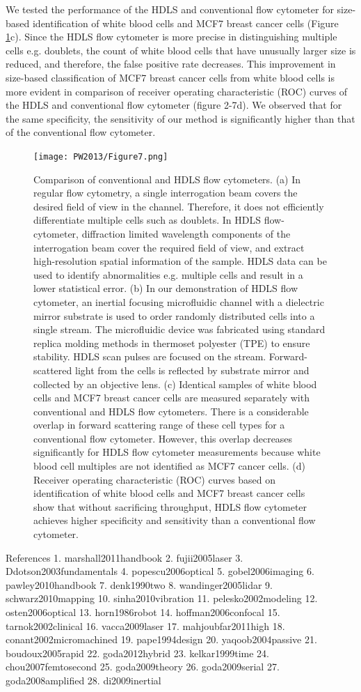 We tested the performance of the HDLS and conventional flow cytometer for size-based identification of white blood cells and MCF7 breast cancer cells (Figure \ref{fig:PW2013_Figure7}c). Since the HDLS flow cytometer is more precise in distinguishing multiple cells e.g. doublets, the count of white blood cells that have unusually larger size is reduced, and therefore, the false positive rate decreases. This improvement in size-based classification of MCF7 breast cancer cells from white blood cells is more evident in comparison of receiver operating characteristic (ROC) curves of the HDLS and conventional flow cytometer (figure 2-7d). We observed that for the same specificity, the sensitivity of our method is significantly higher than that of the conventional flow cytometer. 
 
\begin{figure}[htb!]
\centering
\texttt{[image: PW2013/Figure7.png]}
\caption{Comparison of conventional and HDLS flow cytometers. (a) In regular flow cytometry, a single interrogation beam covers the desired field of view in the channel. Therefore, it does not efficiently differentiate multiple cells such as doublets. In HDLS flow-cytometer, diffraction limited wavelength components of the interrogation beam cover the required field of view, and extract high-resolution spatial information of the sample. HDLS data can be used to identify abnormalities e.g. multiple cells and result in a lower statistical error. (b) In our demonstration of HDLS flow cytometer, an inertial focusing microfluidic channel with a dielectric mirror substrate is used to order randomly distributed cells into a single stream. The microfluidic device was fabricated using standard replica molding methods in thermoset polyester (TPE) to ensure stability. HDLS scan pulses are focused on the stream. Forward-scattered light from the cells is reflected by substrate mirror and collected by an objective lens. (c) Identical samples of white blood cells and MCF7 breast cancer cells are measured separately with conventional and HDLS flow cytometers. There is a considerable overlap in forward scattering range of these cell types for a conventional flow cytometer. However, this overlap decreases significantly for HDLS flow cytometer measurements because white blood cell multiples are not identified as MCF7 cancer cells. (d) Receiver operating characteristic (ROC) curves based on identification of white blood cells and MCF7 breast cancer cells show that without sacrificing throughput, HDLS flow cytometer achieves higher specificity and sensitivity than a conventional flow cytometer.}
\label{fig:PW2013_Figure7}
\end{figure}

References
1.	marshall2011handbook
2.	fujii2005laser
3.	Ddotson2003fundamentals
4.	popescu2006optical
5.	gobel2006imaging
6.	pawley2010handbook
7.	denk1990two
8.	wandinger2005lidar
9.	schwarz2010mapping
10.	sinha2010vibration
11.	pelesko2002modeling
12.	osten2006optical
13.	horn1986robot
14.	hoffman2006confocal
15.	tarnok2002clinical
16.	vacca2009laser
17.	mahjoubfar2011high
18.	conant2002micromachined
19.	pape1994design
20.	yaqoob2004passive
21.	boudoux2005rapid
22.	goda2012hybrid
23.	kelkar1999time
24.	chou2007femtosecond
25.	goda2009theory
26.	goda2009serial
27.	goda2008amplified
28.	di2009inertial